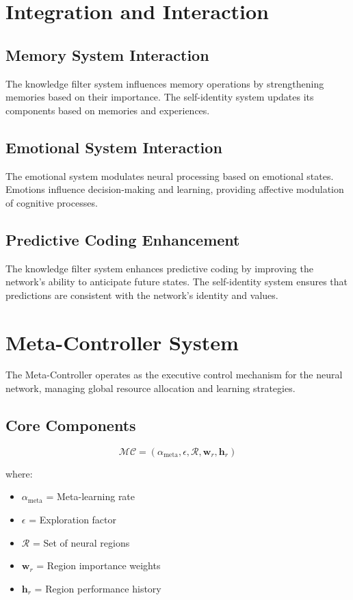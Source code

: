 \documentclass{article}
\begin{document}
\section{Integration and Interaction}

\subsection{Memory System Interaction}
The knowledge filter system influences memory operations by strengthening memories based on their importance. The self-identity system updates its components based on memories and experiences.

\subsection{Emotional System Interaction}
The emotional system modulates neural processing based on emotional states. Emotions influence decision-making and learning, providing affective modulation of cognitive processes.

\subsection{Predictive Coding Enhancement}
The knowledge filter system enhances predictive coding by improving the network's ability to anticipate future states. The self-identity system ensures that predictions are consistent with the network's identity and values.

\section{Meta-Controller System}

The Meta-Controller operates as the executive control mechanism for the neural network, managing global resource allocation and learning strategies.

\subsection{Core Components}

\begin{equation}
\mathcal{MC} = (\alpha_{\text{meta}}, \epsilon, \mathcal{R}, \mathbf{w}_r, \mathbf{h}_r)
\end{equation}

where:
\begin{itemize}
\item $\alpha_{\text{meta}}$ = Meta-learning rate
\item $\epsilon$ = Exploration factor
\item $\mathcal{R}$ = Set of neural regions
\item $\mathbf{w}_r$ = Region importance weights
\item $\mathbf{h}_r$ = Region performance history
\end{itemize}
\end{document}
